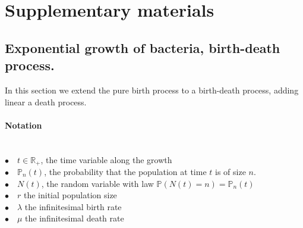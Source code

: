 \documentclass{article}
\newcommand{\pr}{{\mathbb{P}}}
\newcommand{\nN}{{n_\textrm{H}}}
\begin{document}
\section{Supplementary materials}
\subsection{Exponential growth of bacteria, birth-death process.}
In this section we extend the pure birth process to a birth-death process, adding linear a death process.
 \paragraph{Notation} $ $\\
 $\bullet \quad t \in \mathbb{R}_+$, the time variable along the growth\\
 $\bullet \quad \pr_n(t)$, the probability that the population at time $t$ is of size $n$.\\
 $\bullet \quad N(t)$, the random variable with law $\pr(N(t)=n)=\pr_n(t)$\\
 $\bullet \quad r$ the initial population size\\
 $\bullet \quad \lambda$ the infinitesimal birth rate\\
 $\bullet \quad \mu$ the infinitesimal death rate\\
 
\end{document}
